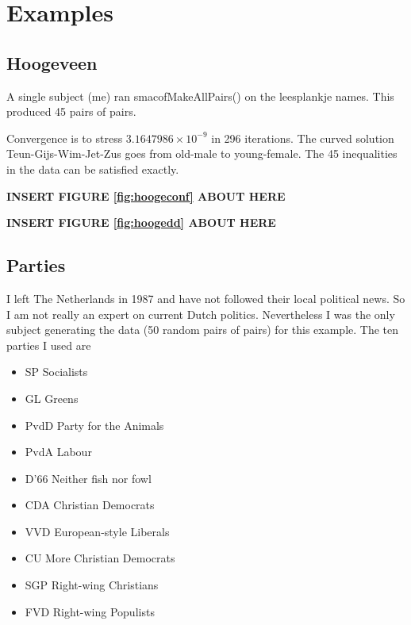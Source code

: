 \documentclass[
  12pt,
]{article}
\providecommand{\tightlist}{%
  \setlength{\itemsep}{0pt}\setlength{\parskip}{0pt}}
\begin{document}
\section{Examples}\label{examples}

\subsection{Hoogeveen}\label{hoogeveen}

A single subject (me) ran smacofMakeAllPairs() on the leesplankje names. This
produced 45 pairs of pairs.

Convergence is to stress \ensuremath{3.1647986\times 10^{-9}} in 296 iterations. The curved solution
Teun-Gijs-Wim-Jet-Zus goes from old-male to young-female. The 45 inequalities
in the data can be satisfied exactly.

\begin{greybox}

\begin{center}
\textbf{INSERT FIGURE \ref{fig:hoogeconf} ABOUT HERE}

\end{center}

\end{greybox}

\begin{greybox}

\begin{center}
\textbf{INSERT FIGURE \ref{fig:hoogedd} ABOUT HERE}

\end{center}

\end{greybox}

\subsection{Parties}\label{parties}

I left The Netherlands in 1987 and have not followed their local political news. So I am not really an expert on current Dutch politics. Nevertheless I was the only subject generating the data (50 random pairs of pairs) for this example. The ten parties I used are

\begin{itemize}
\tightlist
\item
  SP Socialists
\item
  GL Greens
\item
  PvdD Party for the Animals
\item
  PvdA Labour
\item
  D'66 Neither fish nor fowl
\item
  CDA Christian Democrats
\item
  VVD European-style Liberals
\item
  CU More Christian Democrats
\item
  SGP Right-wing Christians
\item
  FVD Right-wing Populists
\end{itemize}
\end{document}
